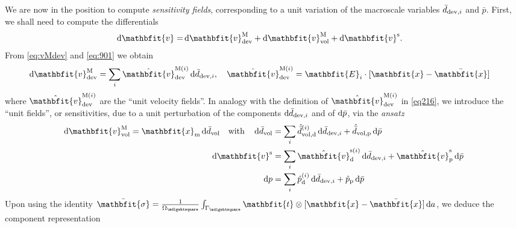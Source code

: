 \documentclass[12pt,a4paper,fleqn]{article}
\renewcommand{\ta}[1]{\mathbfit{#1}}
\renewcommand{\ts}[1]{\mathbfit{#1}}
\renewcommand{\Box}{\mdlgwhtsquare}
\newcommand{\ded}{\mathrm{d}}
\newcommand{\dep}{\mathrm{p}}
\begin{document}
We are now in the position to compute \emph{sensitivity fields}, corresponding to a unit variation of the macroscale variables $\bar{d}_{\mathrm{dev},i}$ and $\bar{p}$. First, we shall need to compute the differentials
\begin{align}
    \dif\ta{v}
     = &
    \dif\ta{v}^\macro_\dev + \dif\ta{v}^\macro_\vol + \dif\ta{v}^\fluct.
\label{eq:dv}
\end{align}
From \eqref{eq:vMdev} and \eqref{eq:901} we obtain
\begin{align}
  \dif \ta{v}^{\macro}_\dev &= \sum_{i} \hat{\ta{v}}^{\macro(i)}_\dev \dif\bar{d}_{\dev,i}, \quad  \hat{\ta{v}}^{\macro(i)}_\dev = \ts E_i \cdot [\ta x - \bar{\ta x}]
\label{eq216}
\end{align}
where $\hat{\ta{v}}^{\macro(i)}_\dev$ are the ``unit velocity fields''.
In analogy with the definition of $\hat{\ta{v}}^{\macro(i)}_\dev$
in \eqref{eq216}, we introduce the ``unit fields'', or sensitivities, due to a unit perturbation of the components $\operatorname{d \!}\bar{d}_{\mathrm{dev},i}$ and of $\operatorname{d \!}\bar{p}$, via the \emph{ansatz}
\begin{align}
    \dif\ta{v}^\macro_\vol = \ta x_\mean \dif \bar{d}_\vol \quad\mbox{with}\quad
    \dif\bar{d}_\vol &= \sum_i \hat{\bar{d}}_{\vol,\ded}^{(i)}\dif\bar{d}_{\dev,i} + \hat{\bar{d}}_{\vol,\dep} \dif \bar{p}
\\
    \dif\ta v^\fluct &= \sum_i \hat{\ta{v}}_{\ded}^{\fluct(i)}\dif\bar{d}_{\dev,i} + \hat{\ta v}_{\dep}^\fluct \dif \bar{p}
\\
    \dif p           &= \sum_i \hat{p}_{\ded}^{(i)}\dif\bar{d}_{\dev,i} + \hat{p}_{\dep} \dif \bar{p}
\end{align}
Upon using the identity $\bar{\ts\sigma}=\frac{1}{\Omega_\Box} \int_{\Gamma_\Box} \ts t \outerp [\ta x - \bar{\ta x}]\dif a$, we deduce the component representation
\end{document}
